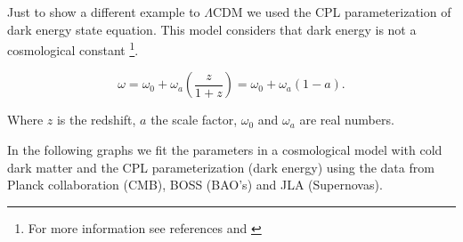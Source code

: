 \documentclass[onecolumn,           %
               showpacs,            %
               preprintnumbers,     %
               aps,                 %
               prl,          	    %
               letterpaper,             %
               superscriptaddress,      %
               nofootinbib,         %
               tightenlines,        %
               floats,floatfix      %
               ,usenatbib,
               ]{revtex4-1}
\begin{document}
Just to show a different example to $\Lambda$CDM we used the CPL parameterization of dark energy state equation. This model considers that dark energy is not a cosmological constant \footnote{For more information see references \cite{CPL1} and \cite{CPL2}}. 

\begin{equation}
\omega = \omega_0 + \omega_a\left(\frac{z}{1 + z}\right) = \omega_0 + \omega_a\left(1 - a\right).
\end{equation}

Where $z$ is the redshift, $a$ the scale factor, $\omega_0$ and $\omega_a$ are real numbers.

In the following graphs we fit the parameters in a cosmological model with cold dark matter and the CPL parameterization (dark energy) using the data from Planck collaboration (CMB), BOSS (BAO's) and JLA (Supernovas). \\
\end{document}
